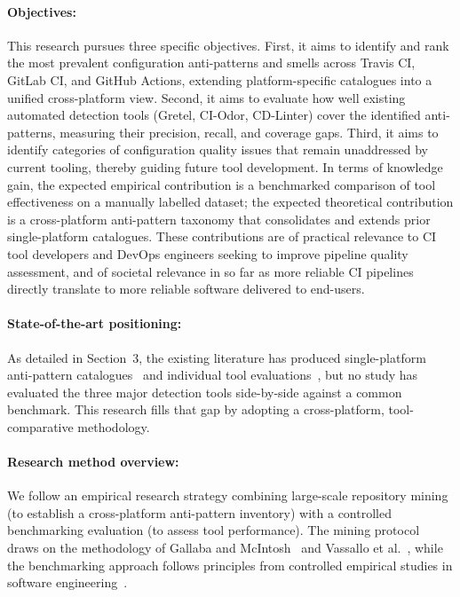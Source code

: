 \documentclass[12pt, a4paper]{article}
\begin{document}
\paragraph{Objectives:} 
This research pursues three specific objectives. First, it aims to identify and rank
the most prevalent configuration anti-patterns and smells across Travis CI, GitLab
CI, and GitHub Actions, extending platform-specific catalogues into a unified
cross-platform view. Second, it aims to evaluate how well existing automated
detection tools (Gretel, CI-Odor, CD-Linter) cover the identified anti-patterns,
measuring their precision, recall, and coverage gaps. Third, it aims to identify
categories of configuration quality issues that remain unaddressed by current tooling,
thereby guiding future tool development. In terms of knowledge gain, the expected
empirical contribution is a benchmarked comparison of tool effectiveness on a
manually labelled dataset; the expected theoretical contribution is a cross-platform
anti-pattern taxonomy that consolidates and extends prior single-platform catalogues.
These contributions are of practical relevance to CI tool developers and DevOps
engineers seeking to improve pipeline quality assessment, and of societal relevance
in so far as more reliable CI pipelines directly translate to more reliable software
delivered to end-users.

\paragraph{State-of-the-art positioning:}
As detailed in Section~3, the existing literature has produced single-platform
anti-pattern catalogues~\cite{gallaba2020, vassallo2020b, kinsman2021} and individual
tool evaluations~\cite{gallaba2020, vassallo2019, vassallo2020b}, but no study has
evaluated the three major detection tools side-by-side against a common benchmark.
This research fills that gap by adopting a cross-platform, tool-comparative methodology.

\paragraph{Research method overview:}
We follow an empirical research strategy combining large-scale repository mining (to
establish a cross-platform anti-pattern inventory) with a controlled benchmarking
evaluation (to assess tool performance). The mining protocol draws on the methodology
of Gallaba and McIntosh~\cite{gallaba2020} and Vassallo et al.~\cite{vassallo2020b},
while the benchmarking approach follows principles from controlled empirical studies
in software engineering~\cite{kinsman2021}.
\end{document}

